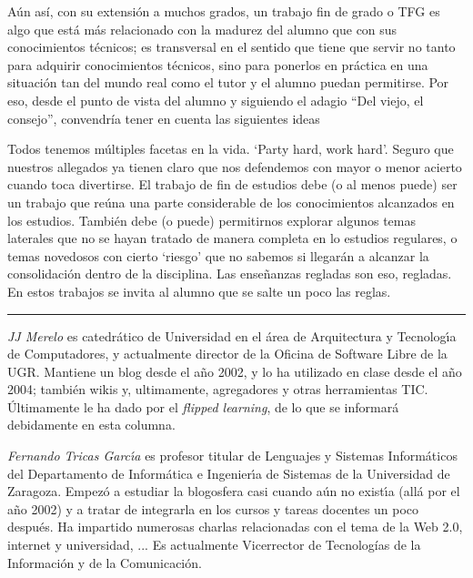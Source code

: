 \documentclass[twoside,10pt]{article}
\newcounter{num}
\begin{document}
\begin{multicols}{2}
A\'un as\'i, con su extensi\'on a muchos grados, un trabajo fin de grado o
TFG es algo que est\'a m\'as relacionado con la madurez del alumno que con
sus conocimientos t\'ecnicos; es transversal en el sentido que tiene que
servir no tanto para adquirir conocimientos t\'ecnicos, sino para ponerlos
en pr\'actica en una situaci\'on tan del mundo real como el tutor y el
alumno puedan permitirse.  Por eso, desde el punto de vista del
alumno y siguiendo el adagio ``Del viejo, el consejo'', convendr\'ia
tener en cuenta las siguientes ideas

Todos tenemos m\'ultiples facetas en la vida. 
`Party hard, work hard'. Seguro que nuestros allegados ya tienen claro que nos
defendemos con mayor o menor acierto cuando toca divertirse. El trabajo de fin
de estudios debe (o al menos puede) ser un trabajo que re\'una una parte
considerable de los conocimientos alcanzados en los estudios. Tambi\'en debe (o
puede) permitirnos explorar algunos temas laterales que no se hayan tratado de
manera completa en lo estudios regulares, o temas novedosos con cierto `riesgo'
que no sabemos si llegar\'an a alcanzar la consolidaci\'on dentro de la
disciplina. Las ense\~nanzas regladas son eso, regladas. En estos trabajos  se
  invita al alumno que se salte un poco las reglas. 

\noindent\rule{86mm}{1pt}
\vspace{1ex} {\small{\begin{window} \noindent\emph{JJ Merelo} es catedr\'{a}tico de Universidad
en el \'area de Arquitectura y Tecnolog\'{\i}a de Computadores, y
actualmente director de la Oficina de Software Libre de la UGR.
Mantiene un blog desde el a\~no 2002, y lo ha utilizado en clase desde
el a\~no 2004; tambi\'en wikis y, ultimamente, agregadores y otras
herramientas TIC. \'{U}ltimamente le ha dado por el \textsl{flipped
learning}, de lo que se informar\'{a} debidamente en esta columna.
\end{window}}}

\medskip

{\small{\begin{window}
		\noindent  \emph{Fernando Tricas Garc\'{\i}a} es profesor
		titular de Lenguajes y Sistemas Inform\'aticos del Departamento
		de Inform\'atica e Ingenier\'{\i}a de Sistemas de la Universidad de
		Zaragoza.  Empez\'o a estudiar la blogosfera casi cuando a\'un no
		exist\'{\i}a (all\'a por el a\~no 2002) y a tratar de integrarla en los
		cursos y tareas docentes un poco despu\'es.  Ha impartido
		numerosas charlas relacionadas con el tema de la Web 2.0, internet y universidad, ...
		Es actualmente Vicerrector de Tecnolog\'ias de la Informaci\'on y
de la Comunicaci\'on.  
		\end{window}}}


\end{multicols}
\end{document}
